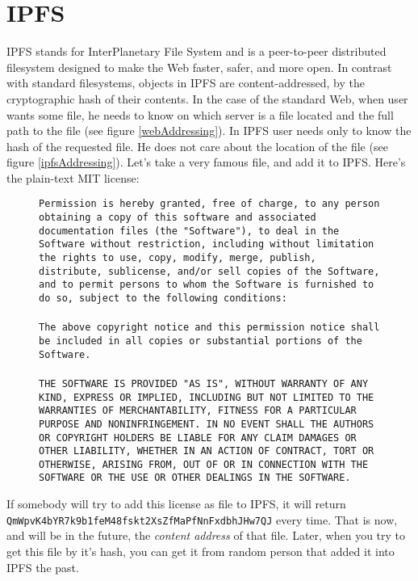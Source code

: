 \chapter{IPFS}
\label{ipfs}

IPFS stands for InterPlanetary File System and is a peer-to-peer distributed filesystem designed to make the Web faster, safer, and more open. In contrast with standard filesystems, objects in IPFS are content-addressed, by the cryptographic hash of their contents. In the case of the standard Web, when user wants some file, he needs to know on which server is a file located and the full path to the file (see figure \ref{webAddressing}). In IPFS user needs only to know the hash of the requested file. He does not care about the location of the file (see figure \ref{ipfsAddressing}). Let’s take a very famous file, and add it to IPFS. Here’s the plain-text MIT license:

\begin{figure}[H]
    \texttt{Permission is hereby granted, free of charge, to any person obtaining a copy of this software and associated documentation files (the "Software"), to deal in the Software without restriction, including without limitation the rights to use, copy, modify, merge, publish, distribute, sublicense, and/or sell copies of the Software, and to permit persons to whom the Software is furnished to do so, subject to the following conditions:\\\\ The above copyright notice and this permission notice shall be included in all copies or substantial portions of the Software.\\\\ THE SOFTWARE IS PROVIDED "AS IS", WITHOUT WARRANTY OF ANY KIND, EXPRESS OR IMPLIED, INCLUDING BUT NOT LIMITED TO THE WARRANTIES OF MERCHANTABILITY, FITNESS FOR A PARTICULAR PURPOSE AND NONINFRINGEMENT. IN NO EVENT SHALL THE AUTHORS OR COPYRIGHT HOLDERS BE LIABLE FOR ANY CLAIM DAMAGES OR OTHER LIABILITY, WHETHER IN AN ACTION OF CONTRACT, TORT OR OTHERWISE, ARISING FROM, OUT OF OR IN CONNECTION WITH THE SOFTWARE OR THE USE OR OTHER DEALINGS IN THE SOFTWARE.}
\end{figure}

\noindent If somebody will try to add this license as file to IPFS, it will return \texttt{QmWpvK4bYR7k9b1feM48fsk\-t2XsZfMaPfNnFxdbhJHw7QJ} every time. That is now, and will be in the future, the \textit{content address} of that file. Later, when you try to get this file by it's hash, you can get it from random person that added it into IPFS the past.


